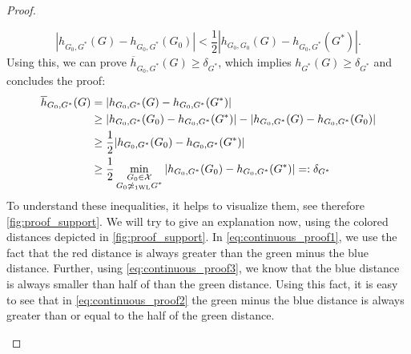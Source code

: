 \begin{proof}
\begin{enumerate}
\begin{equation}
             |h_{G_0, G^*}(G) - h_{G_0, G^*}(G_0)| < \frac{1}{2}|h_{G_0, G_0}(G) - h_{G_0, G^*}(G^*)|.
        \end{equation}
        Using this, we can prove $\overline{h}_{G_0, G^*}(G) \geq \delta_{G^*}$, which implies $h_{G^*}(G) \geq \delta_{G^*}$ and concludes the proof:
        \begin{align}
            \overline{h}_{G_0, G^*}(G) &= |h_{G_0, G^*}(G) - h_{G_0, G^*}(G^*)| \nonumber \\
            &\geq |h_{G_0, G^*}(G_0) - h_{G_0, G^*}(G^*)| - |h_{G_0, G^*}(G) - h_{G_0, G^*}(G_0)|\label{eq:continuous_proof1}\\
            &\geq \frac{1}{2} |h_{G_0, G^*}(G_0) - h_{G_0, G^*}(G^*)|\label{eq:continuous_proof2}\\
            &\geq \frac{1}{2} \min_{\substack{G_0 \in \mathcal{X}\\G_0 \not\simeq_{\text{1WL}} G^*}} |h_{G_0, G^*}(G_0) - h_{G_0, G^*}(G^*)| =: \delta_{G^*} \nonumber
        \end{align}
        To understand these inequalities, it helps to visualize them, see therefore \autoref{fig:proof_support}. We will try to give an explanation now, using the colored distances depicted in \autoref{fig:proof_support}. In \autoref{eq:continuous_proof1}, we use the fact that the red distance is always greater than the green minus the blue distance. Further, using \autoref{eq:continuous_proof3}, we know that the blue distance is always smaller than half of than the green distance. Using this fact, it is easy to see that in \autoref{eq:continuous_proof2} the green minus the blue distance is always greater than or equal to the half of the green distance.


\end{enumerate}
\end{proof}
